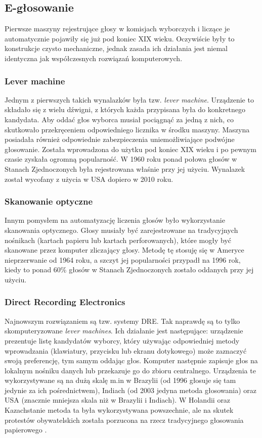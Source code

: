 \documentclass[polish]{kbk}
\begin{document}
\subsection{E-głosowanie \cite{history, equipment}}
Pierwsze maszyny rejestrujące głosy w komisjach wyborczych i liczące je automatycznie pojawiły się już pod koniec XIX wieku. Oczywiście były to konstrukcje czysto mechaniczne, jednak zasada ich działania jest niemal identyczna jak współczesnych rozwiązań komputerowych.

\subsubsection{Lever machine}
Jednym z pierwszych takich wynalazków była tzw. \textit{lever machine}. Urządzenie to składało się z wielu dźwigni, z których każda przypisana była do konkretnego kandydata. Aby oddać głos wyborca musiał pociągnąć
za jedną z nich, co skutkowało przekręceniem odpowiedniego licznika w środku maszyny. Maszyna posiadała również odpowiednie zabezpieczenia uniemożliwiające podwójne głosowanie. Została wprowadzona do użytku pod koniec XIX wieku i po pewnym czasie zyskała ogromną popularność. W 1960 roku ponad połowa głosów w Stanach Zjednoczonych była rejestrowana właśnie przy jej użyciu. Wynalazek został wycofany z użycia w USA dopiero w 2010 roku.

\subsubsection{Skanowanie optyczne}
Innym pomysłem na automatyzację liczenia głosów było wykorzystanie skanowania optycznego. Głosy musiały być zarejestrowane na tradycyjnych nośnikach (kartach papieru lub kartach perforowanych), które mogły być skanowane przez komputer zliczający głosy. Metodę tę stosuję się w Ameryce nieprzerwanie od 1964 roku, a szczyt jej popularności przypadł na 1996 rok, kiedy to ponad 60\% głosów w Stanach Zjednoczonych zostało oddanych przy jej użyciu.

\subsubsection{Direct Recording Electronics}
Najnowszym rozwiązaniem są tzw. systemy DRE. Tak naprawdę są to tylko skomputeryzowane \textit{lever machines}. Ich działanie jest następujące: urządzenie prezentuje listę kandydatów wyborcy, który używając odpowiedniej metody wprowadzania (klawiatury, przycisku lub ekranu dotykowego) może zaznaczyć swoją preferencję, tym samym oddając głos. Komputer następnie zapisuje głos na lokalnym nośniku danych lub przekazuje go do zbioru centralnego.  Urządzenia te wykorzystywane są na dużą skalę m.in w Brazylii (od 1996 głosuje się tam jedynie za ich pośrednictwem), Indiach (od 2003 jedyna metoda głosowania) oraz USA (znacznie mniejsza skala niż w Brazylii i Indiach). W Holandii oraz Kazachstanie metoda ta była wykorzystywana powszechnie, ale na skutek protestów obywatelskich została porzucona na rzecz tradycyjnego głosowania papierowego \cite{usage-wiki}.
\end{document}
